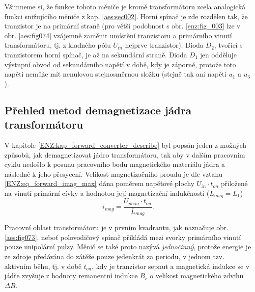     \begin{note}
      Všimneme si, že funkce tohoto měniče je kromě transformátoru zcela analogická funkci
      snižujícího měniče z kap. \ref{aes:sec002}. Horní spínač je zde rozdělen tak, že tranzistor je
      na primární straně (pro větší podobnost s obr. \ref{enz:fig_003} lze v obr.
      \ref{aes:fig074} vzájemně zaměnit umístění tranzistoru a primárního vinutí
      transformátoru, tj. z kladného pólu $U_{in}$ nejprve tranzistor). Dioda $D_2$, tvořící s
      tranzistorem horní spínač, je až na sekundární straně. Dioda $D_1$ jen odděluje výstupní obvod
      od sekundárního napětí v době, kdy je záporné, protože  toto napětí nemůže mít nenulovou
      stejnosměrnou složku (stejně tak ani napětí $u_1$ a $u_3$).
    \end{note}

  \subsection{Přehled metod demagnetizace jádra transformátoru}


    V kapitole \ref{ENZ:kap_forward_converter_describe} byl popsán jeden z možných způsobů, jak
    demagnetizovat jádro transformátoru, tak aby v dalším pracovním cyklu nedošlo k posunu
    pracovního bodu magnetického materiálu jádra a následně k jeho přesycení. Velikost
    magnetizačního proudu je dle vztahu \ref{ENZ:eq_forward_imag_max} dána poměrem napěťové plochy
    $U_{in}\cdot t_{on}$ přiložené na vinutí primární cívky a hodnotou její magnetizační indukčnosti
    ($L_{mag} = L_{1}$) 
    \begin{equation}
       i_{mag} = \frac{U_{prim}\cdot{t_{on}}}{L_{mag}}.
    \end{equation}
    
    Pracovní oblast transformátoru je v prvním kvadrantu, jak naznačuje obr. \ref{aes:fig073}, neboť
    polovodičový spínač přikládá mezi svorky primárního vinutí pouze unipolární pulzy. Měnič se také
    proto nazývá \emph{jednočinný}, protože energie je ze zdroje předávána do zátěže pouze jedenkrát
    za periodu, v jednom tzv. aktivním běhu, tj. v době $t_{on}$, kdy je tranzistor sepnut a
    magnetická indukce se v jádře zvyšuje z hodnoty remanentní indukce $B_r$ o velikost magnetického
    zdvihu $\Delta B$.
    
